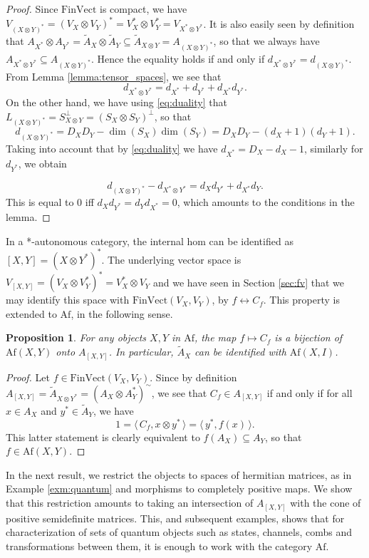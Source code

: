 \documentclass[12pt]{article}
\newtheorem{prop}{Proposition}
\theoremstyle{definition}
\theoremstyle{remark}
\def\<{\langle\,}
\def\>{\,\rangle}
\def \Af{\mathrm{Af}}
\def \FV{\mathrm{FinVect}}
\begin{document}
\begin{proof} Since $\FV$ is compact, we have $V_{(X\otimes Y)^*}=(V_X\otimes
V_Y)^*=V_X^*\otimes V_Y^*=V_{X^*\otimes Y^*}$. It is also easily seen by definition that $A_{X^*}\otimes A_{Y^*}=\tilde A_X\otimes \tilde
A_Y\subseteq \tilde A_{X\otimes Y}=A_{(X\otimes Y)^*}$, so that we always have $A_{X^*\otimes
Y^*}\subseteq A_{(X\otimes Y)^*}$.  Hence the equality holds if and
only if $d_{X^*\otimes Y^*}=d_{(X\otimes Y)^*}$. From Lemma
\ref{lemma:tensor_spaces}, we see that
\[
d_{X^*\otimes Y^*}=d_{X^*}+d_{Y^*}+d_{X^*}d_{Y^*}.
\]
On the other hand, we have using \eqref{eq:duality} that $L_{(X\otimes Y)^*}=S_{X\otimes
Y}^\perp=(S_X\otimes S_Y)^\perp$, so that
\[
d_{(X\otimes Y)^*}=D_XD_Y-\dim(S_X)\dim(S_Y)=D_XD_Y-(d_X+1)(d_Y+1).
\]
Taking into account that by \eqref{eq:duality} we have $d_{X^*}=D_X-d_{X}-1$, similarly
for $d_{Y^*}$, we obtain

\[
d_{(X\otimes Y)^*}-d_{X^*\otimes Y^*}=d_Xd_{Y^*}+d_{X^*}d_Y.
\]
This is equal to 0 iff $d_Xd_{Y^*}=d_Yd_{X^*}=0$, which amounts to the conditions in the
lemma.

\end{proof}



In a *-autonomous category, the internal hom can be identified as $[X,Y]=(X\otimes
Y^*)^*$. The underlying vector space is $V_{[X,Y]}=(V_X\otimes V_Y^*)^*=V_X^*\otimes V_Y$
and we have seen in Section \ref{sec:fv} that we may identify this space with
$\FV(V_X,V_Y)$, by $f \leftrightarrow C_f$. This property is extended to $\Af$, in the
following sense.

\begin{prop}\label{prop:ihom_morphisms} For any objects $X,Y$ in $\Af$, the map $f\mapsto C_f$ is a bijection
of $\Af(X,Y)$ onto $A_{[X,Y]}$. In particular,  $\tilde A_X$ can be identified with
$\Af(X,I)$.

\end{prop}

\begin{proof} Let $f\in \FV(V_X,V_Y)$. Since by definition $A_{[X,Y]}=\tilde A_{X\otimes
Y^*}=(A_X\otimes A_Y^*)^\sim$, we see that $C_f\in A_{[X,Y]}$ if and only
if for all $x\in A_X$ and $y^*\in \tilde A_Y$, we have
\[
1=\<C_f, x\otimes y^*\>=\<y^*,f(x)\>.
\]
This latter statement is clearly equivalent to $f(A_X)\subseteq A_Y$, so that $f\in
\Af(X,Y)$. 

\end{proof}

In the next result, we restrict the objects to spaces of hermitian matrices, as in Example
\ref{exm:quantum} and morphisms to completely positive maps. We show that this restriction
amounts to taking an intersection of $A_{[X,Y]}$ with the cone of positive semidefinite
matrices. This, and subsequent examples,  shows that for characterization of sets  of quantum
objects such as states, channels, combs and transformations between them, it is enough to
work with the category $\Af$. 
\end{document}
